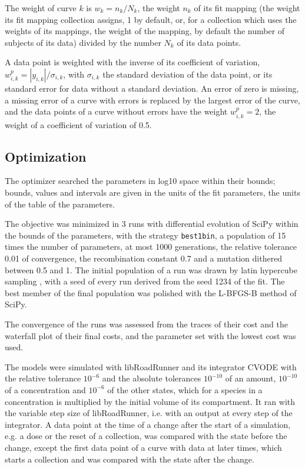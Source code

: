 The weight of curve $k$ is $w_k = n_k / N_k$, the weight $n_k$ of its fit mapping (the weight its fit mapping collection assigns, 1 by default, or, for a collection which uses the weights of its mappings, the weight of the mapping, by default the number of subjects of its data) divided by the number $N_k$ of its data points.

A data point is weighted with the inverse of its coefficient of variation, $w^{p}_{i,k} = |y_{i,k}| / \sigma_{i,k}$, with $\sigma_{i,k}$ the standard deviation of the data point, or its standard error for data without a standard deviation. An error of zero is missing, a missing error of a curve with errors is replaced by the largest error of the curve, and the data points of a curve without errors have the weight $w^{p}_{i,k} = 2$, the weight of a coefficient of variation of 0.5.

\subsection{Optimization}

The optimizer searched the parameters in log10 space within their bounds; bounds, values and intervals are given in the units of the fit parameters, the units of the table of the parameters.

The objective was minimized in 3 runs with differential evolution \cite{Storn1997} of SciPy \cite{Virtanen2020} within the bounds of the parameters, with the strategy \texttt{best1bin}, a population of 15 times the number of parameters, at most 1000 generations, the relative tolerance 0.01 of convergence, the recombination constant 0.7 and a mutation dithered between 0.5 and 1. The initial population of a run was drawn by latin hypercube sampling \cite{McKay1979}, with a seed of every run derived from the seed 1234 of the fit. The best member of the final population was polished with the L-BFGS-B method of SciPy.

The convergence of the runs was assessed from the traces of their cost and the waterfall plot of their final costs, and the parameter set with the lowest cost was used.

The models were simulated with libRoadRunner \cite{Welsh2023} and its integrator CVODE \cite{Hindmarsh2005} with the relative tolerance $10^{-6}$ and the absolute tolerances $10^{-10}$ of an amount, $10^{-10}$ of a concentration and $10^{-6}$ of the other states, which for a species in a concentration is multiplied by the initial volume of its compartment. It ran with the variable step size of libRoadRunner, i.e. with an output at every step of the integrator. A data point at the time of a change after the start of a simulation, e.g. a dose or the reset of a collection, was compared with the state before the change, except the first data point of a curve with data at later times, which starts a collection and was compared with the state after the change.

